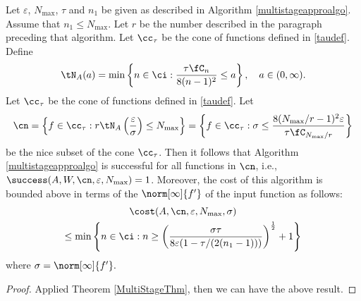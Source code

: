 \begin{theorem}   Let  $\varepsilon$, $N_{\max}$, $\tau$ and $n_1$ be given as described in Algorithm \ref{multistageapproalgo}.
Assume that $n_1 \le N_{\max}$. Let $r$ be the number described in the paragraph preceding that algorithm.
Let $\cc_\tau$ be the cone of functions defined in \eqref{taudef}.
Define
\[
\tN_A(a) = \min\left\{ n \in \ci : \frac{\tau \fC_n }{8(n-1)^2} \le a \right\}, \quad a \in (0,\infty).
\]
Let $\cc_\tau$ be the cone of functions defined in \eqref{taudef}.  Let
$$
\cn = \left \{ f \in \cc_\tau :r\tN_{A}\left(\frac{\varepsilon}{\sigma} \right) \le N_{\max} \right\}
= \left \{ f \in \cc_\tau : \sigma \le \frac{8(N_{\max}/r-1)^2 \varepsilon }{\tau \fC_{N_{\max}/r}  } \right\}
$$
be the nice subset of the cone $\cc_\tau$.  Then it follows that Algorithm \ref{multistageapproalgo} is successful for all functions in $\cn$,  i.e.,  $\success(A,W,\cn,\varepsilon,N_{\max}) = 1$.  Moreover, the cost of this algorithm is bounded above in terms of the $\norm[\infty]{f'}$ of the input function as follows:
\begin{multline}
\cost(A,\cn,\varepsilon,N_{\max},\sigma) \\
\le  \min\left\{ n \in \ci : n \ge \left(\frac{\sigma\tau}{8\varepsilon(1 - \tau/(2(n_{1}-1)))}\right)^{\frac{1}{2}} +1\right\}
\end{multline} where $\sigma=\norm[\infty]{f'}.$
\end{theorem}

\begin{proof}
Applied Theorem \ref{MultiStageThm}, then we can have the above result.
\end{proof}




